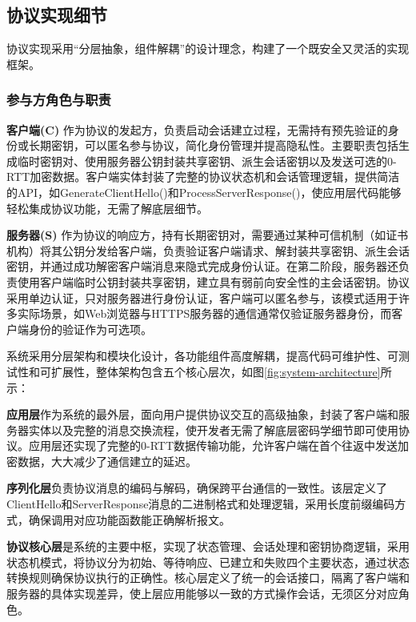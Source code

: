 \subsection{协议实现细节}
\label{subsec:implementation_details}

协议实现采用“分层抽象，组件解耦”的设计理念，构建了一个既安全又灵活的实现框架。

\subsubsection{参与方角色与职责}

\textbf{客户端(C)} 作为协议的发起方，负责启动会话建立过程，无需持有预先验证的身份或长期密钥，可以匿名参与协议，简化身份管理并提高隐私性。主要职责包括生成临时密钥对、使用服务器公钥封装共享密钥、派生会话密钥以及发送可选的0-RTT加密数据。客户端实体封装了完整的协议状态机和会话管理逻辑，提供简洁的API，如GenerateClientHello()和ProcessServerResponse()，使应用层代码能够轻松集成协议功能，无需了解底层细节。

\textbf{服务器(S)} 作为协议的响应方，持有长期密钥对，需要通过某种可信机制（如证书机构）将其公钥分发给客户端，负责验证客户端请求、解封装共享密钥、派生会话密钥，并通过成功解密客户端消息来隐式完成身份认证。在第二阶段，服务器还负责使用客户端临时公钥封装共享密钥，建立具有弱前向安全性的主会话密钥。协议采用单边认证，只对服务器进行身份认证，客户端可以匿名参与，该模式适用于许多实际场景，如Web浏览器与HTTPS服务器的通信通常仅验证服务器身份，而客户端身份的验证作为可选项。

\label{subsubsec:system_architecture}
系统采用分层架构和模块化设计，各功能组件高度解耦，提高代码可维护性、可测试性和可扩展性，整体架构包含五个核心层次，如图\ref{fig:system-architecture}所示：

\textbf{应用层}作为系统的最外层，面向用户提供协议交互的高级抽象，封装了客户端和服务器实体以及完整的消息交换流程，使开发者无需了解底层密码学细节即可使用协议。应用层还实现了完整的0-RTT数据传输功能，允许客户端在首个往返中发送加密数据，大大减少了通信建立的延迟。

\textbf{序列化层}负责协议消息的编码与解码，确保跨平台通信的一致性。该层定义了ClientHello和ServerResponse消息的二进制格式和处理逻辑，采用长度前缀编码方式，确保调用对应功能函数能正确解析报文。

\textbf{协议核心层}是系统的主要中枢，实现了状态管理、会话处理和密钥协商逻辑，采用状态机模式，将协议分为初始、等待响应、已建立和失败四个主要状态，通过状态转换规则确保协议执行的正确性。核心层定义了统一的会话接口，隔离了客户端和服务器的具体实现差异，使上层应用能够以一致的方式操作会话，无须区分对应角色。

